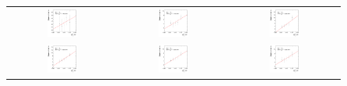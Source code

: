 \begin{figure}[ht]
  \centering
  \begin{tabular}{ccc}
    \includegraphics[width=0.3\textwidth]{figures/ResFit_Spring10QCDFlat_CB_Eta0_ExtrapolatedPar2_PtBin0} &
    \includegraphics[width=0.3\textwidth]{figures/ResFit_Spring10QCDFlat_CB_Eta0_ExtrapolatedPar2_PtBin1} &
    \includegraphics[width=0.3\textwidth]{figures/ResFit_Spring10QCDFlat_CB_Eta0_ExtrapolatedPar2_PtBin2} \\

    \includegraphics[width=0.3\textwidth]{figures/ResFit_Spring10QCDFlat_CB_Eta0_ExtrapolatedPar2_PtBin3} &
    \includegraphics[width=0.3\textwidth]{figures/ResFit_Spring10QCDFlat_CB_Eta0_ExtrapolatedPar2_PtBin4} &
    \includegraphics[width=0.3\textwidth]{figures/ResFit_Spring10QCDFlat_CB_Eta0_ExtrapolatedPar2_PtBin5} \\


\end{tabular}
\end{figure}
